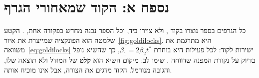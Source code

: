 \chapter*{נספח א: הקוד שמאחורי הגרף}

כל הגרפים בספר נוצרו בקוד , ולא צוירו ביד, וכל הספר נבנה מחדש בפקודה אחת, . הקטע שלמטה הוא הפונקציה שמייצרת את איור~\ref{fig:goldilocks}. היא מתרגמת את משוואה~\eqref{eq:goldilocks} ישירות לקוד: לכל פעילות היא בוחרת $\beta_1 = 2\beta_2 t^{*}$, כך שהשיא נופל בדיוק על נקודת המפנה שדווחה \parencite{oii2017press, przybylski2017}. שימו לב: מיקום השיא הוא \textbf{קלט} של המודל ולא תוצאה שלו, והגובה מנורמל. הקוד מדגים את הצורה, אבל אינו מוכיח אותה.

